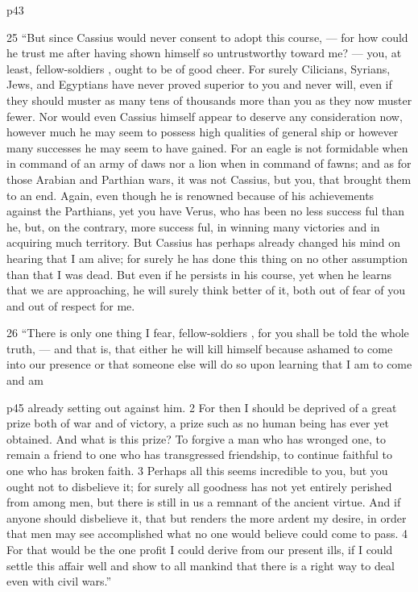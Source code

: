 p43

25
``But since Cassius would never consent to adopt this course, \texthebrew{—} for how could he trust me after having shown himself so untrustworthy toward me? \texthebrew{—} you, at least, fellow-soldiers , ought to be of good cheer. For surely Cilicians, Syrians, Jews, and Egyptians have never proved superior to you and never will, even if they should muster as many tens of thousands more than you as they now muster fewer. Nor would even Cassius himself appear to deserve any consideration now, however much he may seem to possess high qualities of general ­ship or however many successes he may seem to have gained. For an eagle is not formidable when in command of an army of daws nor a lion when in command of fawns; and as for those Arabian and Parthian wars, it was not Cassius, but you, that brought them to an end. Again, even though he is renowned because of his achievements against the Parthians, yet you have Verus, who has been no less success ­ful than he, but, on the contrary, more success ­ful, in winning many victories and in acquiring much territory. But Cassius has perhaps already changed his mind on hearing that I am alive; for surely he has done this thing on no other assumption than that I was dead. But even if he persists in his course, yet when he learns that we are approaching, he will surely think better of it, both out of fear of you and out of respect for me.

26
``There is only one thing I fear, fellow-soldiers , for you shall be told the whole truth, \texthebrew{—} and that is, that either he will kill himself because ashamed to come into our presence or that someone else will do so upon learning that I am to come and am

p45 already setting out against him. 2 For then I should be deprived of a great prize both of war and of victory, a prize such as no human being has ever yet obtained. And what is this prize? To forgive a man who has wronged one, to remain a friend to one who has transgressed friendship, to continue faithful to one who has broken faith. 3 Perhaps all this seems incredible to you, but you ought not to disbelieve it; for surely all goodness has not yet entirely perished from among men, but there is still in us a remnant of the ancient virtue. And if anyone should disbelieve it, that but renders the more ardent my desire, in order that men may see accomplished what no one would believe could come to pass. 4 For that would be the one profit I could derive from our present ills, if I could settle this affair well and show to all mankind that there is a right way to deal even with civil wars.''

